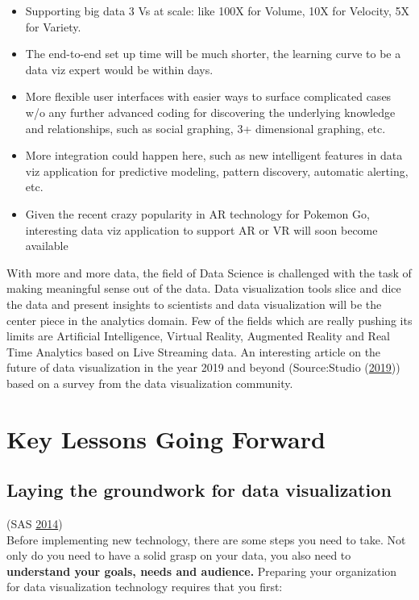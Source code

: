 \documentclass[]{book}
\providecommand{\tightlist}{%
  \setlength{\itemsep}{0pt}\setlength{\parskip}{0pt}}
\begin{document}
\begin{itemize}
\tightlist
\item
  Supporting big data 3 Vs at scale: like 100X for Volume, 10X for Velocity, 5X for Variety.
\item
  The end-to-end set up time will be much shorter, the learning curve to be a data viz expert would be within days.
\item
  More flexible user interfaces with easier ways to surface complicated cases w/o any further advanced coding for discovering the underlying knowledge and relationships, such as social graphing, 3+ dimensional graphing, etc.
\item
  More integration could happen here, such as new intelligent features in data viz application for predictive modeling, pattern discovery, automatic alerting, etc.
\item
  Given the recent crazy popularity in AR technology for Pokemon Go, interesting data viz application to support AR or VR will soon become available
\end{itemize}

With more and more data, the field of Data Science is challenged with the task of making meaningful sense out of the data. Data visualization tools slice and dice the data and present insights to scientists and data visualization will be the center piece in the analytics domain. Few of the fields which are really pushing its limits are Artificial Intelligence, Virtual Reality, Augmented Reality and Real Time Analytics based on Live Streaming data. An interesting article on the future of data visualization in the year 2019 and beyond (Source:Studio (\protect\hyperlink{ref-depictdatastudio}{2019})) based on a survey from the data visualization community.

\hypertarget{key-lessons-going-forward}{%
\section{Key Lessons Going Forward}\label{key-lessons-going-forward}}

\hypertarget{laying-the-groundwork-for-data-visualization}{%
\subsection{Laying the groundwork for data visualization}\label{laying-the-groundwork-for-data-visualization}}

(SAS \protect\hyperlink{ref-why_dataviz_matters}{2014})\\
Before implementing new technology, there are some steps you need to take. Not only do you need to have a solid grasp on your data, you also need to \textbf{understand your goals, needs and audience.} Preparing your organization for data visualization technology requires that you first:
\end{document}
